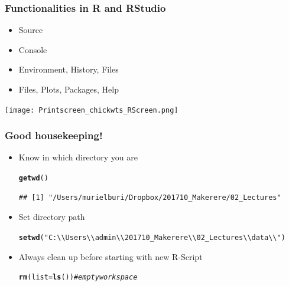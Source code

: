 \documentclass{beamer}\usepackage[]{graphicx}\usepackage[]{color}
\makeatletter
\newcommand{\hlstr}[1]{\textcolor[rgb]{0.192,0.494,0.8}{#1}}%
\newcommand{\hlcom}[1]{\textcolor[rgb]{0.678,0.584,0.686}{\textit{#1}}}%
\newcommand{\hlstd}[1]{\textcolor[rgb]{0.345,0.345,0.345}{#1}}%
\newcommand{\hlkwc}[1]{\textcolor[rgb]{0.333,0.667,0.333}{#1}}%
\newcommand{\hlkwd}[1]{\textcolor[rgb]{0.737,0.353,0.396}{\textbf{#1}}}%
\newenvironment{kframe}{%
 \def\at@end@of@kframe{}%
 \ifinner\ifhmode%
  \def\at@end@of@kframe{\end{minipage}}%
  \begin{minipage}{\columnwidth}%
 \fi\fi%
 \def\FrameCommand##1{\hskip\@totalleftmargin \hskip-\fboxsep
 \colorbox{shadecolor}{##1}\hskip-\fboxsep
     \hskip-\linewidth \hskip-\@totalleftmargin \hskip\columnwidth}%
 \MakeFramed {\advance\hsize-\width
   \@totalleftmargin\z@ \linewidth\hsize
   \@setminipage}}%
 {\par\unskip\endMakeFramed%
 \at@end@of@kframe}
\newenvironment{knitrout}{}{} %
\makeatother
\begin{document}
{
\begin{frame}
\frametitle{Functionalities in R and RStudio}
\begin{itemize}
\item Source
\item Console
\item Environment, History, Files
\item Files, Plots, Packages, Help
\end{itemize}
%
\begin{center}
\texttt{[image: Printscreen\_chickwts\_RScreen.png]}
\end{center}
%
\end{frame}


{
\begin{frame}[fragile]
\frametitle{Good housekeeping!}
\begin{itemize}
\setlength\itemsep{1.5em}
\item Know in which directory you are
\begin{knitrout}\scriptsize
{}\color{fgcolor}\begin{kframe}
\begin{alltt}
\hlkwd{getwd}\hlstd{()}
\end{alltt}
\begin{verbatim}
## [1] "/Users/murielburi/Dropbox/201710_Makerere/02_Lectures"
\end{verbatim}
\end{kframe}
\end{knitrout}
\item Set directory path
\begin{knitrout}\scriptsize
{}\color{fgcolor}\begin{kframe}
\begin{alltt}
\hlkwd{setwd}\hlstd{(}\hlstr{"C:\textbackslash{}\textbackslash{}Users\textbackslash{}\textbackslash{}admin\textbackslash{}\textbackslash{}201710_Makerere\textbackslash{}\textbackslash{}02_Lectures\textbackslash{}\textbackslash{}data\textbackslash{}\textbackslash{}"}\hlstd{)}
\end{alltt}
\end{kframe}
\end{knitrout}
\item Always clean up before starting with new R-Script
\begin{knitrout}\scriptsize
{}\color{fgcolor}\begin{kframe}
\begin{alltt}
\hlkwd{rm}\hlstd{(}\hlkwc{list}\hlstd{=}\hlkwd{ls}\hlstd{())} \hlcom{# empty workspace}
\end{alltt}
\end{kframe}
\end{knitrout}
\end{itemize}
\end{frame}

}}
\end{document}
